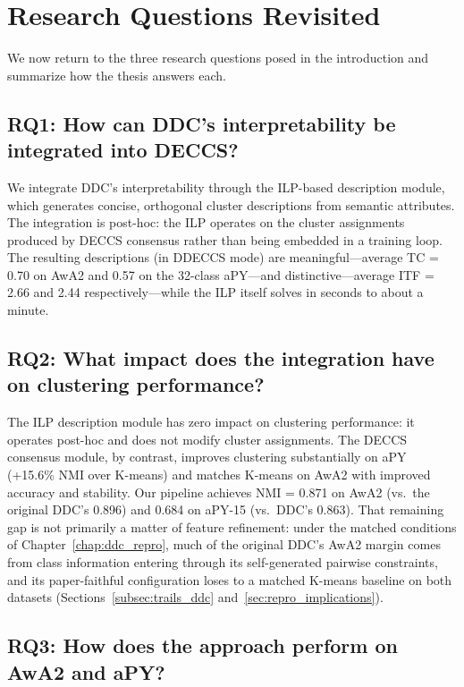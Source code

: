 \section{Research Questions Revisited}
\label{sec:rq_revisited}

We now return to the three research questions posed in the introduction and summarize how the thesis answers each.

\subsection{RQ1: How can DDC's interpretability be integrated into DECCS?}

We integrate DDC's interpretability through the ILP-based description module, which generates concise, orthogonal cluster descriptions from semantic attributes. The integration is post-hoc: the ILP operates on the cluster assignments produced by DECCS consensus rather than being embedded in a training loop. The resulting descriptions (in DDECCS mode) are meaningful---average TC = 0.70 on AwA2 and 0.57 on the 32-class aPY---and distinctive---average ITF = 2.66 and 2.44 respectively---while the ILP itself solves in seconds to about a minute.

\subsection{RQ2: What impact does the integration have on clustering performance?}

The ILP description module has zero impact on clustering performance: it operates post-hoc and does not modify cluster assignments. The DECCS consensus module, by contrast, improves clustering substantially on aPY (+15.6\% NMI over K-means) and matches K-means on AwA2 with improved accuracy and stability. Our pipeline achieves NMI = 0.871 on AwA2 (vs.\ the original DDC's 0.896) and 0.684 on aPY-15 (vs.\ DDC's 0.863). That remaining gap is not primarily a matter of feature refinement: under the matched conditions of Chapter~\ref{chap:ddc_repro}, much of the original DDC's AwA2 margin comes from class information entering through its self-generated pairwise constraints, and its paper-faithful configuration loses to a matched K-means baseline on both datasets (Sections~\ref{subsec:trails_ddc} and~\ref{sec:repro_implications}).

\subsection{RQ3: How does the approach perform on AwA2 and aPY?}

